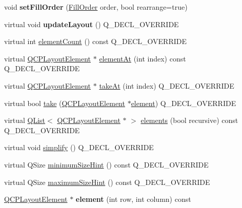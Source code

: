 \begin{DoxyCompactItemize}
\item 
void {\bfseries set\+Fill\+Order} (\hyperlink{class_q_c_p_layout_grid_a7d49ee08773de6b2fd246edfed353cca}{Fill\+Order} order, bool rearrange=true)\hypertarget{class_q_c_p_layout_grid_affc2f3cfd22f28698c5b29b960d2a391}{}\label{class_q_c_p_layout_grid_affc2f3cfd22f28698c5b29b960d2a391}

\item 
virtual void {\bfseries update\+Layout} () Q\+\_\+\+D\+E\+C\+L\+\_\+\+O\+V\+E\+R\+R\+I\+DE\hypertarget{class_q_c_p_layout_grid_aabc84d32716b12488540803d716fbc80}{}\label{class_q_c_p_layout_grid_aabc84d32716b12488540803d716fbc80}

\item 
virtual int \hyperlink{class_q_c_p_layout_grid_a9a8942aface780a02445ebcf14c48513}{element\+Count} () const Q\+\_\+\+D\+E\+C\+L\+\_\+\+O\+V\+E\+R\+R\+I\+DE
\item 
virtual \hyperlink{class_q_c_p_layout_element}{Q\+C\+P\+Layout\+Element} $\ast$ \hyperlink{class_q_c_p_layout_grid_a8b420c8ecfcd5cfb3673c2dfa0577286}{element\+At} (int index) const Q\+\_\+\+D\+E\+C\+L\+\_\+\+O\+V\+E\+R\+R\+I\+DE
\item 
virtual \hyperlink{class_q_c_p_layout_element}{Q\+C\+P\+Layout\+Element} $\ast$ \hyperlink{class_q_c_p_layout_grid_a6c649e95e9550f671ca130d7ebc97feb}{take\+At} (int index) Q\+\_\+\+D\+E\+C\+L\+\_\+\+O\+V\+E\+R\+R\+I\+DE
\item 
virtual bool \hyperlink{class_q_c_p_layout_grid_a97b7dbaae963fc34bd7427318dab8861}{take} (\hyperlink{class_q_c_p_layout_element}{Q\+C\+P\+Layout\+Element} $\ast$\hyperlink{class_q_c_p_layout_grid_a525f25e6ba43ee228151d074251b4e6a}{element}) Q\+\_\+\+D\+E\+C\+L\+\_\+\+O\+V\+E\+R\+R\+I\+DE
\item 
virtual \hyperlink{class_q_list}{Q\+List}$<$ \hyperlink{class_q_c_p_layout_element}{Q\+C\+P\+Layout\+Element} $\ast$ $>$ \hyperlink{class_q_c_p_layout_grid_adc2b77187862688f52796d208bd9756c}{elements} (bool recursive) const Q\+\_\+\+D\+E\+C\+L\+\_\+\+O\+V\+E\+R\+R\+I\+DE
\item 
virtual void \hyperlink{class_q_c_p_layout_grid_a07841807e57ea5f6f0072250797defc0}{simplify} () Q\+\_\+\+D\+E\+C\+L\+\_\+\+O\+V\+E\+R\+R\+I\+DE
\item 
virtual Q\+Size \hyperlink{class_q_c_p_layout_grid_a57515592661621cc07d027867bcfc4de}{minimum\+Size\+Hint} () const Q\+\_\+\+D\+E\+C\+L\+\_\+\+O\+V\+E\+R\+R\+I\+DE
\item 
virtual Q\+Size \hyperlink{class_q_c_p_layout_grid_a22505c47e97c26621116072994e70cf3}{maximum\+Size\+Hint} () const Q\+\_\+\+D\+E\+C\+L\+\_\+\+O\+V\+E\+R\+R\+I\+DE
\item 
\hyperlink{class_q_c_p_layout_element}{Q\+C\+P\+Layout\+Element} $\ast$ {\bfseries element} (int row, int column) const \hypertarget{class_q_c_p_layout_grid_a90f229820b5b804c1035fb36e0464de7}{}\label{class_q_c_p_layout_grid_a90f229820b5b804c1035fb36e0464de7}


\end{DoxyCompactItemize}
